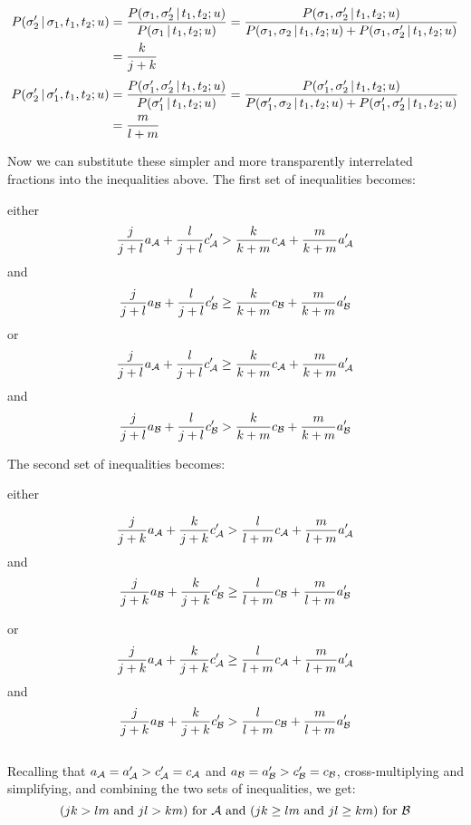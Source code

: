 \begin{align*}P(\sigma'_2 \,|\, \sigma_1, t_1, t_2; u)  & = \frac{P(\sigma_1, \sigma'_2 \,|\, t_1, t_2; u)}{P(\sigma_1 \,|\, t_1, t_2; u)} = \frac{P(\sigma_1, \sigma'_2 \,|\, t_1, t_2; u)}{P(\sigma_1, \sigma_2 \,|\, t_1, t_2; u) + P(\sigma_1, \sigma'_2 \,|\, t_1, t_2; u)}     \\ & =  \frac{k}{j + k} \end{align*}
\begin{align*}P(\sigma'_2 \,|\, \sigma'_1, t_1, t_2; u) & = \frac{P(\sigma'_1, \sigma'_2 \,|\, t_1, t_2; u)}{P(\sigma'_1 \,|\, t_1, t_2; u)} = \frac{P(\sigma'_1, \sigma'_2 \,|\, t_1, t_2; u)}{P(\sigma'_1, \sigma_2 \,|\, t_1, t_2; u) + P(\sigma'_1, \sigma'_2 \,|\, t_1, t_2; u)} \\ & =  \frac{m}{l + m}\end{align*} 


\noindent Now we can substitute these simpler and more transparently interrelated fractions into the inequalities above. The first set of inequalities becomes: \label{page:Pareto-Nash inequalities}

\noindent either
\[ \frac{j}{j + l}a_{\cal A} + \frac{l}{j + l}c'_{\cal A} > \frac{k}{k + m}c_{\cal A} + \frac{m}{k + m}a'_{\cal A} \]
and
\[ \frac{j}{j + l}a_{\cal B} + \frac{l}{j + l}c'_{\cal B} \geq \frac{k}{k + m}c_{\cal B} + \frac{m}{k + m}a'_{\cal B} \]
\noindent or
\[ \frac{j}{j + l}a_{\cal A} + \frac{l}{j + l}c'_{\cal A} \geq \frac{k}{k + m}c_{\cal A} + \frac{m}{k + m}a'_{\cal A} \]
and
\[ \frac{j}{j + l}a_{\cal B} + \frac{l}{j + l}c'_{\cal B} > \frac{k}{k + m}c_{\cal B} + \frac{m}{k + m}a'_{\cal B} \]

\noindent The second set of inequalities becomes:

\noindent either

\[ \frac{j}{j + k}a_{\cal A} + \frac{k}{j + k}c'_{\cal A} > \frac{l}{l + m}c_{\cal A} + \frac{m}{l + m}a'_{\cal A} \]
and
\[ \frac{j}{j + k}a_{\cal B} + \frac{k}{j + k}c'_{\cal B} \geq \frac{l}{l + m}c_{\cal B} + \frac{m}{l + m}a'_{\cal B} \]

\noindent or
\[ \frac{j}{j + k}a_{\cal A} + \frac{k}{j + k}c'_{\cal A} \geq \frac{l}{l + m}c_{\cal A} + \frac{m}{l + m}a'_{\cal A} \]
and
\[ \frac{j}{j + k}a_{\cal B} + \frac{k}{j + k}c'_{\cal B} > \frac{l}{l + m}c_{\cal B} + \frac{m}{l + m}a'_{\cal B} \]
~\\
\noindent Recalling that $a_{\cal A} = a'_{\cal A} > c'_{\cal A} = c_{\cal A}$ and $a_{\cal B} = a'_{\cal B} > c'_{\cal B} = c_{\cal B}$, cross-multiplying and simplifying, and combining the two sets of inequalities, we get:
\[ (jk > lm\ \hbox{and}\ jl > km)\ \hbox{for}\ {\cal A}\ \hbox{and}\ (jk \geq lm\ \hbox{and}\ jl \geq km)\  \hbox{for}\ {\cal B} \]

